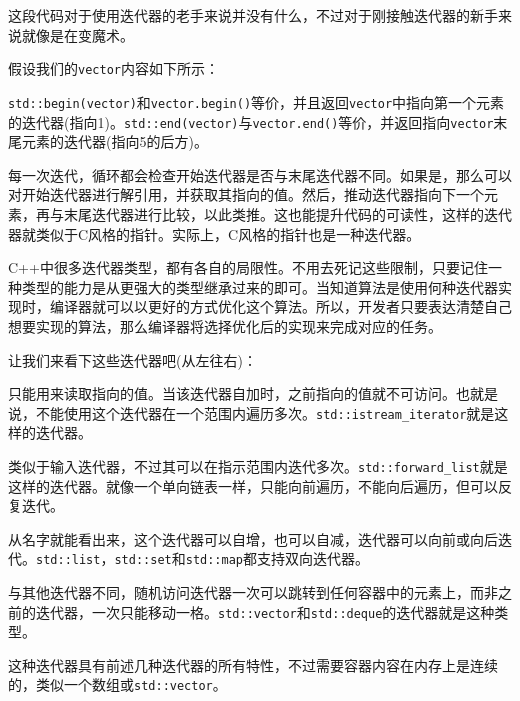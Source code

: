 这段代码对于使用迭代器的老手来说并没有什么，不过对于刚接触迭代器的新手来说就像是在变魔术。

假设我们的\texttt{vector}内容如下所示：


\texttt{std::begin(vector)}和\texttt{vector.begin()}等价，并且返回\texttt{vector}中指向第一个元素的迭代器(指向1)。\texttt{std::end(vector)}与\texttt{vector.end()}等价，并返回指向\texttt{vector}末尾元素的迭代器(指向5的后方)。

每一次迭代，循环都会检查开始迭代器是否与末尾迭代器不同。如果是，那么可以对开始迭代器进行解引用，并获取其指向的值。然后，推动迭代器指向下一个元素，再与末尾迭代器进行比较，以此类推。这也能提升代码的可读性，这样的迭代器就类似于C风格的指针。实际上，C风格的指针也是一种迭代器。


C++中很多迭代器类型，都有各自的局限性。不用去死记这些限制，只要记住一种类型的能力是从更强大的类型继承过来的即可。当知道算法是使用何种迭代器实现时，编译器就可以以更好的方式优化这个算法。所以，开发者只要表达清楚自己想要实现的算法，那么编译器将选择优化后的实现来完成对应的任务。

让我们来看下这些迭代器吧(从左往右)：



只能用来读取指向的值。当该迭代器自加时，之前指向的值就不可访问。也就是说，不能使用这个迭代器在一个范围内遍历多次。\texttt{std::istream\_iterator}就是这样的迭代器。


类似于输入迭代器，不过其可以在指示范围内迭代多次。\texttt{std::forward\_list}就是这样的迭代器。就像一个单向链表一样，只能向前遍历，不能向后遍历，但可以反复迭代。


从名字就能看出来，这个迭代器可以自增，也可以自减，迭代器可以向前或向后迭代。\texttt{std::list}，\texttt{std::set}和\texttt{std::map}都支持双向迭代器。


与其他迭代器不同，随机访问迭代器一次可以跳转到任何容器中的元素上，而非之前的迭代器，一次只能移动一格。\texttt{std::vector}和\texttt{std::deque}的迭代器就是这种类型。


这种迭代器具有前述几种迭代器的所有特性，不过需要容器内容在内存上是连续的，类似一个数组或\texttt{std::vector}。

